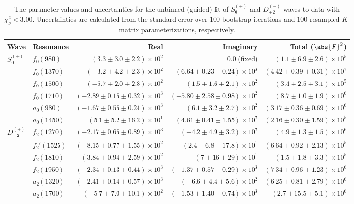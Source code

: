 \begin{table}[ht]
    \begin{center}
        \begin{tabular}{llrrr}\toprule
        Wave & Resonance & Real & Imaginary & Total ($\abs{F}^2$) \\\midrule
$S_{0}^{(+)}$ & $f_{0}(980)$ & $(3.3 \pm 3.0 \pm 2.2) \times 10^{2}$ & $0.0$ (fixed) & $(1.1 \pm 6.9 \pm 2.6) \times 10^{5}$ \\
 & $f_{0}(1370)$ & $(-3.2 \pm 4.2 \pm 2.3) \times 10^{2}$ & $(6.64 \pm 0.23 \pm 0.24) \times 10^{3}$ & $(4.42 \pm 0.39 \pm 0.31) \times 10^{7}$ \\
 & $f_{0}(1500)$ & $(-5.7 \pm 2.0 \pm 2.8) \times 10^{2}$ & $(1.5 \pm 1.6 \pm 2.1) \times 10^{2}$ & $(3.4 \pm 2.5 \pm 3.1) \times 10^{5}$ \\
 & $f_{0}(1710)$ & $(-2.89 \pm 0.15 \pm 0.32) \times 10^{3}$ & $(-5.80 \pm 2.58 \pm 0.98) \times 10^{2}$ & $(8.7 \pm 1.0 \pm 1.9) \times 10^{6}$ \\
 & $a_{0}(980)$ & $(-1.67 \pm 0.55 \pm 0.24) \times 10^{3}$ & $(6.1 \pm 3.2 \pm 2.7) \times 10^{2}$ & $(3.17 \pm 0.36 \pm 0.69) \times 10^{6}$ \\
 & $a_{0}(1450)$ & $(5.1 \pm 5.2 \pm 16.2) \times 10^{1}$ & $(4.61 \pm 0.41 \pm 1.55) \times 10^{2}$ & $(2.16 \pm 0.30 \pm 1.59) \times 10^{5}$ \\
$D_{+2}^{(+)}$ & $f_{2}(1270)$ & $(-2.17 \pm 0.65 \pm 0.89) \times 10^{3}$ & $(-4.2 \pm 4.9 \pm 3.2) \times 10^{2}$ & $(4.9 \pm 1.3 \pm 1.5) \times 10^{6}$ \\
 & $f_{2}'(1525)$ & $(-8.15 \pm 0.77 \pm 1.55) \times 10^{2}$ & $(2.4 \pm 6.8 \pm 17.8) \times 10^{1}$ & $(6.64 \pm 0.92 \pm 2.13) \times 10^{5}$ \\
 & $f_{2}(1810)$ & $(3.84 \pm 0.94 \pm 2.59) \times 10^{2}$ & $(7 \pm 16 \pm 29) \times 10^{1}$ & $(1.5 \pm 1.8 \pm 3.3) \times 10^{5}$ \\
 & $f_{2}(1950)$ & $(-2.34 \pm 0.13 \pm 0.44) \times 10^{3}$ & $(-1.37 \pm 0.57 \pm 0.29) \times 10^{3}$ & $(7.34 \pm 0.96 \pm 1.23) \times 10^{6}$ \\
 & $a_{2}(1320)$ & $(-2.41 \pm 0.14 \pm 0.57) \times 10^{3}$ & $(-6.6 \pm 4.4 \pm 5.6) \times 10^{2}$ & $(6.25 \pm 0.81 \pm 2.79) \times 10^{6}$ \\
 & $a_{2}(1700)$ & $(-5.7 \pm 7.0 \pm 10.1) \times 10^{2}$ & $(-1.53 \pm 1.40 \pm 0.74) \times 10^{3}$ & $(2.7 \pm 15.5 \pm 5.1) \times 10^{6}$ \\\bottomrule
        \end{tabular}
    \caption{The parameter values and uncertainties for the unbinned (guided) fit of $S_{0}^{(+)}$ and $D_{+2}^{(+)}$ waves to data with $\chi^2_\nu < 3.00$. Uncertainties are calculated from the standard error over $100$ bootstrap iterations and $100$ resampled $K$-matrix parameterizations, respectively.}\label{tab:unbinned-fit-chisqdof-3.0-guided-resampled-Sp0p-Dp2p}
    \end{center}
\end{table}
